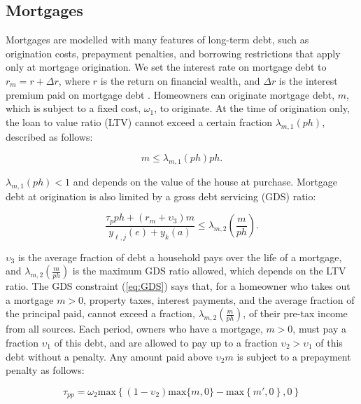 \documentclass[parskip=full]{article}
\begin{document}
\subsection{Mortgages}\label{subsection:morgtages}

Mortgages are modelled with many features of long-term debt, such as origination costs, prepayment penalties, and borrowing restrictions that apply only at mortgage origination. We set the interest rate on mortgage debt to $r_{m}=r+\Delta r$, where $r$ is the return on financial wealth, and $\Delta r$ is the interest premium paid on mortgage debt \citep{sommeretal-2013,sommersullivan-2017,kaplanetal-2019}. Homeowners can originate mortgage debt, $m$, which is subject to a fixed cost, $\omega_{1}$, to originate. At the time of origination only, the loan to value ratio (LTV) cannot exceed a certain fraction $\lambda_{m,1}(ph)$, described as follows:

\begin{equation}\label{eq:LTV}
m \leq \lambda_{m,1}(ph) p h.
\end{equation}

\noindent $\lambda_{m,1}(ph)<1$ and depends on the value of the house at purchase. Mortgage debt at origination is also limited by a gross debt servicing (GDS) ratio: 

\begin{equation}\label{eq:GDS}
\frac{\tau_{p}ph+(r_{m}+\upsilon_{3})m}{y_{\ell,j}(e)+y_{k}(a)} \leq \lambda_{m,2}\left(\frac{m}{ph}\right).
\end{equation}

\noindent $\upsilon_{3}$ is the average fraction of debt a household pays over the life of a mortgage, and $\lambda_{m,2}\left(\frac{m}{ph}\right)$ is the maximum GDS ratio allowed, which depends on the LTV ratio. The GDS constraint (\ref{eq:GDS}) says that, for a homeowner who takes out a mortgage $m>0$, property taxes, interest payments, and the average fraction of the principal paid, cannot exceed a fraction, $\lambda_{m,2}\left(\frac{m}{ph}\right)$, of their pre-tax income from all sources. Each period, owners who have a mortgage, $m>0$, must pay a fraction $\upsilon_{1}$ of this debt, and are allowed to pay up to a fraction $\upsilon_{2}>\upsilon_{1}$ of this debt without a penalty. Any amount paid above $\upsilon_{2}m$ is subject to a prepayment penalty as follows: 

\begin{equation}\label{eq:prepayment_penalty}
\tau_{pp}=\omega_{2}\mbox{max}\left\{(1-\upsilon_{2})\mbox{max}\{m,0\}-\mbox{max}\left\{m',0\right\},0\right\}
\end{equation}
\end{document}
